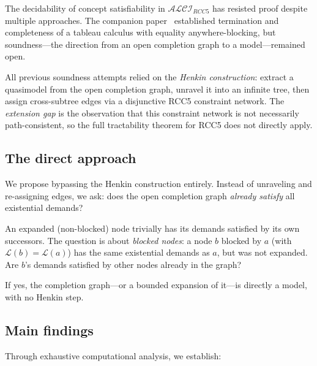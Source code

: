 \documentclass[a4paper,11pt]{article}
\theoremstyle{definition}
\newcommand{\ALCIRCC}[1]{\ensuremath{\mathcal{ALCI}_{\mathit{RCC#1}}}}
\begin{document}
The decidability of concept satisfiability in $\ALCIRCC{5}$ has
resisted proof despite multiple approaches.  The companion
paper~\cite{CompanionPaper} established termination and completeness
of a tableau calculus with equality anywhere-blocking, but
soundness---the direction from an open completion graph to a
model---remained open.

All previous soundness attempts relied on the \emph{Henkin
construction}: extract a quasimodel from the open completion graph,
unravel it into an infinite tree, then assign cross-subtree edges
via a disjunctive RCC5 constraint network.  The \emph{extension gap}
is the observation that this constraint network is not necessarily
path-consistent, so the full tractability theorem for RCC5 does not
directly apply.

\subsection{The direct approach}

We propose bypassing the Henkin construction entirely.  Instead of
unraveling and re-assigning edges, we ask: does the open completion
graph \emph{already satisfy} all existential demands?

An expanded (non-blocked) node trivially has its demands satisfied
by its own successors.  The question is about \emph{blocked nodes}:
a node $b$ blocked by $a$ (with $\mathcal{L}(b) = \mathcal{L}(a)$)
has the same existential demands as $a$, but was not expanded.
Are $b$'s demands satisfied by other nodes already in the graph?

If yes, the completion graph---or a bounded expansion of it---is
directly a model, with no Henkin step.

\subsection{Main findings}

Through exhaustive computational analysis, we establish:
\end{document}
